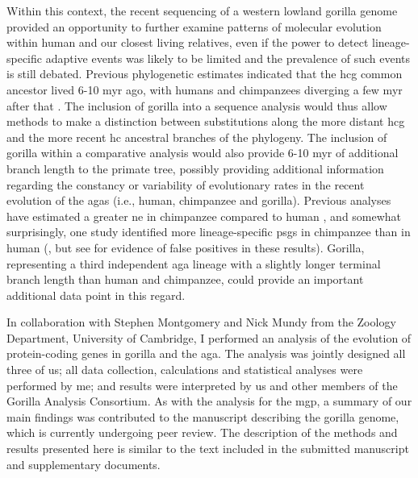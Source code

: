 Within this context, the recent sequencing of a western lowland
gorilla genome provided an opportunity to further examine patterns of
molecular evolution within human and our closest living relatives,
even if the power to detect lineage-specific adaptive events was
likely to be limited and the prevalence of such events is still
debated. Previous phylogenetic estimates indicated that the \ac{hcg}
common ancestor lived 6-10 \ac{myr} ago, with humans and chimpanzees
diverging a few \ac{myr} after that \citep{Bradley2008}. The inclusion
of gorilla into a sequence analysis would thus allow methods to make a
distinction between substitutions along the more distant \ac{hcg} and
the more recent \ac{hc} ancestral branches of the phylogeny. The
inclusion of gorilla within a comparative analysis would also provide
6-10 \ac{myr} of additional branch length to the primate tree,
possibly providing additional information regarding the constancy or
variability of evolutionary rates in the recent evolution of the
\acp{aga} (i.e., human, chimpanzee and gorilla). Previous analyses
have estimated a greater \ac{ne} in chimpanzee compared to human
\citep{Sequencing2005a,Siepel2009a}, and somewhat surprisingly, one
study identified more lineage-specific \acp{psg} in chimpanzee than in
human (\citet{Bakewell2007}, but see \citet{Mallick2009} for evidence
of false positives in these results). Gorilla, representing a third
independent \ac{aga} lineage with a slightly longer terminal branch
length than human and chimpanzee, could provide an important
additional data point in this regard.

In collaboration with Stephen Montgomery and Nick Mundy from the
Zoology Department, University of Cambridge, I performed an analysis
of the evolution of protein-coding genes in gorilla and the
\ac{aga}. The analysis was jointly designed all three of us; all data
collection, calculations and statistical analyses were performed by
me; and results were interpreted by us and other members of the
Gorilla Analysis Consortium. As with the analysis for the \acl{mgp}, a
summary of our main findings was contributed to the manuscript
describing the gorilla genome, which is currently undergoing peer
review. The description of the methods and results presented here is
similar to the text included in the submitted manuscript and
supplementary documents.


